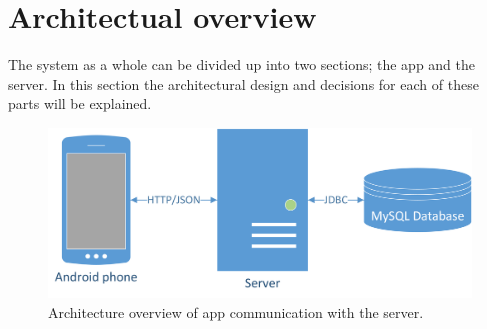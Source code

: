 \newpage
\section{Architectual overview}
The system as a whole can be divided up into two sections; the app and the server. In this section the architectural design and decisions for each of these parts will be explained.

\begin{figure}[H]
\includegraphics[width=\textwidth]{ch/architecture/fig/arch.png}
\caption{Architecture overview of app communication with the server.}
\label{fig:architecture}
\end{figure}

